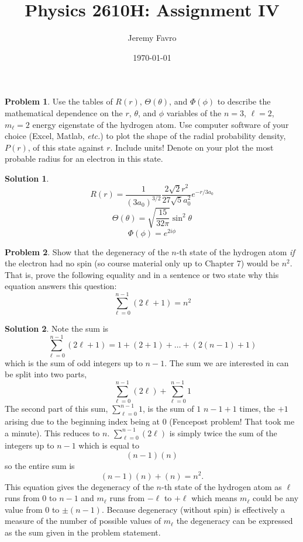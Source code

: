 \documentclass[10pt]{article}
\title{Physics 2610H: Assignment IV}
\author{Jeremy Favro}
\date{\today}
\theoremstyle{definition}
\newtheorem{problem}{Problem}
\newtheorem{soln}{Solution}
\begin{document}
\maketitle

\begin{problem}
Use the tables of $R(r)$, $\Theta(\theta)$, and $\Phi(\phi)$ to describe the mathematical dependence on the $r$, $\theta$, and $\phi$
variables of the $n = 3$, $\ell=2$, $m_\ell=2$ energy eigenstate of the hydrogen atom. Use computer software of
your choice (Excel, Matlab, \emph{etc.}) to plot the shape of the radial probability density, $P(r)$, of this state
against $r$. Include units! Denote on your plot the most probable radius for an electron in this state.
\end{problem}
\begin{soln}
  $$R(r)=\frac{1}{\left(3a_0\right)^{3/2}}\frac{2\sqrt{2}r^2}{27\sqrt{5}a_0^2}e^{-r/3a_0}$$
  $$\Theta(\theta)=\sqrt{\frac{15}{32\pi}}\sin^2\theta$$
  $$\Phi(\phi)=e^{2i\phi}$$
\end{soln}

\begin{problem}
Show that the degeneracy of the $n$-th state of the hydrogen atom \emph{if} the electron had no spin (so course
material only up to Chapter 7) would be $n^2$. That is, prove the following equality and in a sentence or two
state why this equation answers this question:
$$\sum_{\ell=0}^{n-1}\left(2\ell+1\right)=n^2$$
\end{problem}
\begin{soln}
  Note the sum is
  $$\sum_{\ell=0}^{n-1}(2\ell+1)=1+(2+1)+\dots+(2(n-1)+1)$$
  which is the sum of odd integers up to $n-1$. The sum we are interested in can be split into two parts,
  $$\sum_{\ell=0}^{n-1}(2\ell)+\sum_{\ell=0}^{n-1}1$$
  The second part of this sum, $\sum_{\ell=0}^{n-1}1$, is the sum of $1$ $n-1+1$ times, the $+1$ arising due to the beginning index being at
  $0$ (Fencepost problem! That took me a minute). This reduces to $n$.
  $\sum_{\ell=0}^{n-1}(2\ell)$ is simply twice the sum of the integers up to $n-1$ which is equal to
  $$(n-1)(n)$$
  so the entire sum is
  $$(n-1)(n)+(n)=n^2.$$
  This equation gives the degeneracy of the $n$-th state of the hydrogen atom as $\ell$ runs from $0$ to $n-1$ and $m_\ell$ runs from $-\ell$ to $+\ell$
  which means $m_\ell$ could be any value from $0$ to $\pm(n-1)$. Because degeneracy (without spin) is effectively a
  measure of the number of possible values of $m_\ell$ the degeneracy can be expressed as the sum given in the problem statement.
\end{soln}
\end{document}

